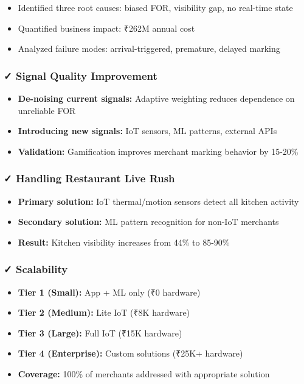 \documentclass[11pt,a4paper]{article}
\begin{document}
\begin{itemize}[leftmargin=*]
    \item Identified three root causes: biased FOR, visibility gap, no real-time state
    \item Quantified business impact: ₹262M annual cost
    \item Analyzed failure modes: arrival-triggered, premature, delayed marking
\end{itemize}

\subsubsection{✓ Signal Quality Improvement}

\begin{itemize}[leftmargin=*]
    \item \textbf{De-noising current signals:} Adaptive weighting reduces dependence on unreliable FOR
    \item \textbf{Introducing new signals:} IoT sensors, ML patterns, external APIs
    \item \textbf{Validation:} Gamification improves merchant marking behavior by 15-20\%
\end{itemize}

\subsubsection{✓ Handling Restaurant Live Rush}

\begin{itemize}[leftmargin=*]
    \item \textbf{Primary solution:} IoT thermal/motion sensors detect all kitchen activity
    \item \textbf{Secondary solution:} ML pattern recognition for non-IoT merchants
    \item \textbf{Result:} Kitchen visibility increases from 44\% to 85-90\%
\end{itemize}

\subsubsection{✓ Scalability}

\begin{itemize}[leftmargin=*]
    \item \textbf{Tier 1 (Small):} App + ML only (₹0 hardware)
    \item \textbf{Tier 2 (Medium):} Lite IoT (₹8K hardware)
    \item \textbf{Tier 3 (Large):} Full IoT (₹15K hardware)
    \item \textbf{Tier 4 (Enterprise):} Custom solutions (₹25K+ hardware)
    \item \textbf{Coverage:} 100\% of merchants addressed with appropriate solution
\end{itemize}
\end{document}
